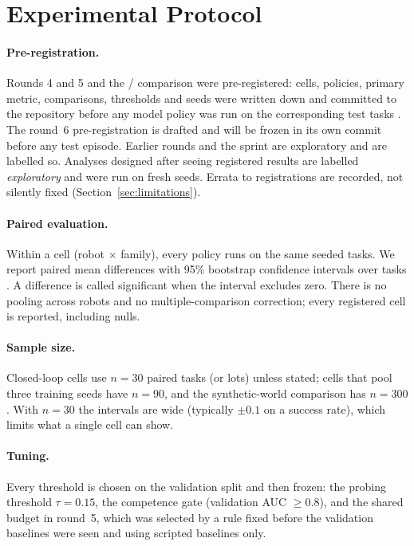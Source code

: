 \section{Experimental Protocol}
\label{sec:protocol}

\paragraph{Pre-registration.} Rounds 4 and 5 and the \sysI/\sysII{} comparison were pre-registered: cells,
policies, primary metric, comparisons, thresholds and seeds were written down and committed to the repository
before any model policy was run on the corresponding test tasks \citep{nosek2018preregistration}. The round~6
pre-registration is drafted and will be frozen in its own commit before any test episode. Earlier rounds and
the sprint are exploratory and are labelled so. Analyses designed after seeing registered results are labelled
\emph{exploratory} and were run on fresh seeds. Errata to registrations are recorded, not silently fixed
(Section~\ref{sec:limitations}).

\paragraph{Paired evaluation.} Within a cell (robot $\times$ family), every policy runs on the same seeded
tasks. We report paired mean differences with 95\% bootstrap confidence intervals over tasks
\citep{efron1979bootstrap,efron1993introduction}. A difference is called significant when the interval
excludes zero. There is no pooling across robots and no multiple-comparison correction; every registered cell is
reported, including nulls.

\paragraph{Sample size.} Closed-loop cells use $n = 30$ paired tasks (or lots) unless stated; cells that pool
three training seeds have $n = 90$, and the synthetic-world comparison has $n = 300$. With $n = 30$ the
intervals are wide (typically $\pm 0.1$ on a success rate), which limits what a single cell can show.

\paragraph{Tuning.} Every threshold is chosen on the validation split and then frozen: the probing threshold
$\tau = 0.15$, the competence gate (validation AUC $\ge 0.8$), and the shared budget in round~5, which was
selected by a rule fixed before the validation baselines were seen and using scripted baselines only.

